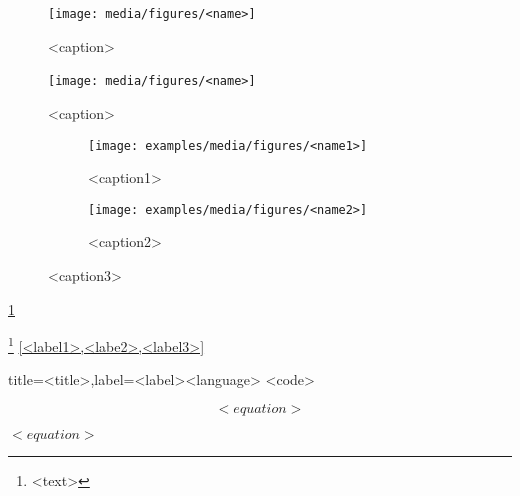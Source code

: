 \cite{}

\begin{figure}[!htb]
    \centering
    \texttt{[image: media/figures/<name>]}\
    \caption{<caption>}
    \label{fig:<label>}
\end{figure}
\begin{figure}[H]
    \centering
    \texttt{[image: media/figures/<name>]}\
    \caption{<caption>}
    \label{fig:<label>}
\end{figure}
\begin{figure}[!htb]
    \centering
    \label{fig:<label3>}
    \begin{subfigure}{0.4\textwidth}
        \texttt{[image: examples/media/figures/<name1>]}
        \caption{<caption1>}
        \label{fig:<ref1>}
    \end{subfigure}
    \begin{subfigure}{0.4\textwidth}
        \texttt{[image: examples/media/figures/<name2>]}
        \caption{<caption2>}
        \label{fig:<label2>}
    \end{subfigure}
    \caption{<caption3>}
\end{figure}

\acrshort{}
\acrlong{}
\acrfull{}
\Gls{}
\gls{}

\ref{<label>}

\footnote{\label{<label>}<text>}
\cref{<label1>,<labe2>,<label3>}



\begin{code}[numbers=left]{title=<title>,label=<label>}{<language>}
<code>
\end{code}


\begin{theorem}[title=<title>, label=<label>]
\end{theorem}


\begin{equation}
<equation>
\end{equation}

$<equation>$